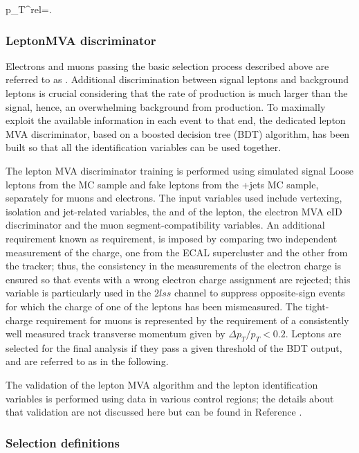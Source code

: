 \beqn
p_T^{rel}=.
\eeqn


\subsubsection*{LeptonMVA discriminator}\label{sssec:leptonmva}

Electrons and muons passing the basic selection process described above are referred to as . Additional discrimination between signal leptons and background leptons is crucial considering that the rate of \ttbar production is much larger than the signal, hence, an overwhelming background from \ttbar production. To maximally exploit the available information in each event to that end, the dedicated lepton MVA discriminator, based on a boosted decision tree (BDT) algorithm, has been built so that all the identification variables can be used together.

The lepton MVA discriminator training is performed using simulated signal Loose leptons from the \ttH MC sample and fake leptons from the \ttbar+jets MC sample, separately for muons and electrons. The input variables used include vertexing, isolation and jet-related variables, the \pt and \etac of the lepton, the electron MVA eID discriminator and the muon segment-compatibility variables. An additional requirement known as  requirement, is imposed by comparing two independent measurement of the charge, one from the ECAL supercluster and the other from the tracker; thus, the consistency in the measurements of the electron charge is ensured so that events with a wrong electron charge assignment are rejected; this variable is particularly used in the $2lss$ channel to suppress opposite-sign events for which the charge of one of the leptons has been mismeasured. The tight-charge requirement for muons is represented by the requirement of a consistently well measured track transverse momentum given by $\Delta p_T/p_T < 0.2$.          
Leptons are selected for the final analysis if they pass a given threshold of the BDT output, and are referred to as  in the following.          

The validation of the lepton MVA algorithm and the lepton identification variables is performed using data in various control regions; the details about that validation are not discussed here but can be found in Reference \cite{CMS_AN_2017-029}. 

\subsubsection*{Selection definitions}

